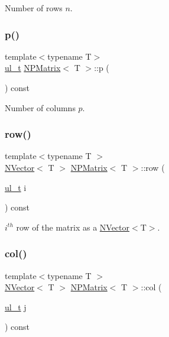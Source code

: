 Number of rows $ n $. 

\mbox{\label{class_n_p_matrix_a3beee8acb5babf62d2b4f212ac5d18e8}} 
\subsubsection{\texorpdfstring{p()}{p()}}
{\footnotesize\ttfamily template$<$typename T$>$ \\
\mbox{\hyperlink{group___n_algebra_ga1b140a2034db3f5dfe18a987745df43a}{ul\+\_\+t}} \mbox{\hyperlink{class_n_p_matrix}{N\+P\+Matrix}}$<$ T $>$\+::p (\begin{DoxyParamCaption}{ }\end{DoxyParamCaption}) const\hspace{0.3cm}{\ttfamily [inline]}}



Number of columns $ p $. 

\mbox{\label{class_n_p_matrix_a99ae2d8850ecdb33fbd9a71804ab4ea7}} 
\subsubsection{\texorpdfstring{row()}{row()}}
{\footnotesize\ttfamily template$<$typename T $>$ \\
\mbox{\hyperlink{class_n_vector}{N\+Vector}}$<$ T $>$ \mbox{\hyperlink{class_n_p_matrix}{N\+P\+Matrix}}$<$ T $>$\+::row (\begin{DoxyParamCaption}\item[{\mbox{\hyperlink{group___n_algebra_ga1b140a2034db3f5dfe18a987745df43a}{ul\+\_\+t}}}]{i }\end{DoxyParamCaption}) const}



$ i^{th} $ row of the matrix as a {\ttfamily \mbox{\hyperlink{class_n_vector}{N\+Vector}}$<$T$>$}. 

\mbox{\label{class_n_p_matrix_aa137db97da518f1dfb69e7eb8fa1b94d}} 
\subsubsection{\texorpdfstring{col()}{col()}}
{\footnotesize\ttfamily template$<$typename T $>$ \\
\mbox{\hyperlink{class_n_vector}{N\+Vector}}$<$ T $>$ \mbox{\hyperlink{class_n_p_matrix}{N\+P\+Matrix}}$<$ T $>$\+::col (\begin{DoxyParamCaption}\item[{\mbox{\hyperlink{group___n_algebra_ga1b140a2034db3f5dfe18a987745df43a}{ul\+\_\+t}}}]{j }\end{DoxyParamCaption}) const}



